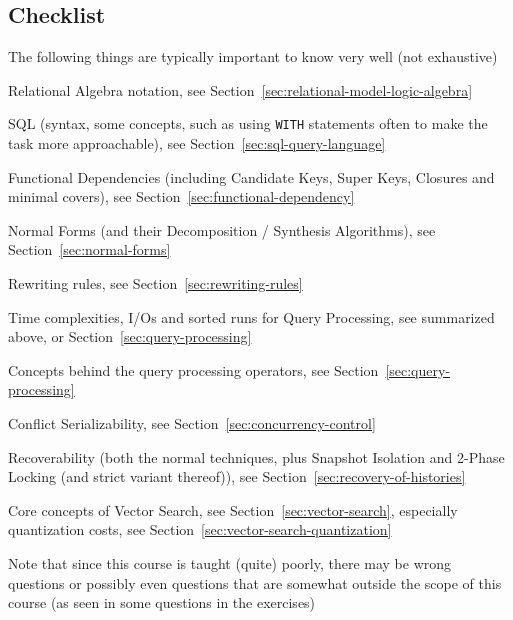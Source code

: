 \newpage
\subsection{Checklist}
The following things are typically important to know very well (not exhaustive)
\begin{todolist}
    \item Relational Algebra notation, see Section~\ref{sec:relational-model-logic-algebra}
    \item SQL (syntax, some concepts, such as using \texttt{WITH} statements often to make the task more approachable), see Section~\ref{sec:sql-query-language}
    \item Functional Dependencies (including Candidate Keys, Super Keys, Closures and minimal covers), see Section~\ref{sec:functional-dependency}
    \item Normal Forms (and their Decomposition / Synthesis Algorithms), see Section~\ref{sec:normal-forms}
    \item Rewriting rules, see Section~\ref{sec:rewriting-rules}
    \item Time complexities, I/Os and sorted runs for Query Processing, see summarized above, or Section~\ref{sec:query-processing}
    \item Concepts behind the query processing operators, see Section~\ref{sec:query-processing}
    \item Conflict Serializability, see Section~\ref{sec:concurrency-control}
    \item Recoverability (both the normal techniques, plus Snapshot Isolation and 2-Phase Locking (and strict variant thereof)), see Section~\ref{sec:recovery-of-histories}
    \item Core concepts of Vector Search, see Section~\ref{sec:vector-search}, especially quantization costs, see Section~\ref{sec:vector-search-quantization}
\end{todolist}

Note that since this course is taught (quite) poorly, there may be wrong questions or possibly even questions that are somewhat outside the scope of this course
(as seen in some questions in the exercises)
